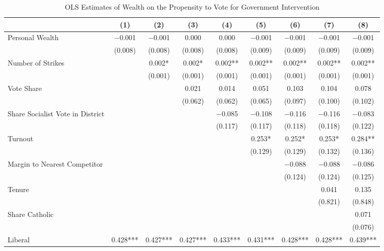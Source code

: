 \begin{table}

\caption{\label{tab:baseline_ols_govtint}OLS Estimates of Wealth on the Propensity to Vote for Government Intervention}
\centering
\begin{tabular}[t]{lcccccccc}
\toprule
  & (1) & (2) & (3) & (4) & (5) & (6) & (7) & (8)\\
\midrule
Personal Wealth & \num{-0.001} & \num{-0.001} & \num{0.000} & \num{0.000} & \num{-0.001} & \num{-0.001} & \num{-0.001} & \num{-0.001}\\
 & (\num{0.008}) & (\num{0.008}) & (\num{0.008}) & (\num{0.008}) & (\num{0.009}) & (\num{0.009}) & (\num{0.009}) & (\num{0.009})\\
Number of Strikes &  & \num{0.002}* & \num{0.002}* & \num{0.002}** & \num{0.002}** & \num{0.002}** & \num{0.002}** & \num{0.002}**\\
 &  & (\num{0.001}) & (\num{0.001}) & (\num{0.001}) & (\num{0.001}) & (\num{0.001}) & (\num{0.001}) & (\num{0.001})\\
Vote Share &  &  & \num{0.021} & \num{0.014} & \num{0.051} & \num{0.103} & \num{0.104} & \num{0.078}\\
 &  &  & (\num{0.062}) & (\num{0.062}) & (\num{0.065}) & (\num{0.097}) & (\num{0.100}) & (\num{0.102})\\
Share Socialist Vote in District &  &  &  & \num{-0.085} & \num{-0.108} & \num{-0.116} & \num{-0.116} & \num{-0.083}\\
 &  &  &  & (\num{0.117}) & (\num{0.117}) & (\num{0.118}) & (\num{0.118}) & (\num{0.122})\\
Turnout &  &  &  &  & \num{0.253}* & \num{0.252}* & \num{0.253}* & \num{0.284}**\\
 &  &  &  &  & (\num{0.129}) & (\num{0.129}) & (\num{0.132}) & (\num{0.136})\\
Margin to Nearest Competitor &  &  &  &  &  & \num{-0.088} & \num{-0.088} & \num{-0.086}\\
 &  &  &  &  &  & (\num{0.124}) & (\num{0.124}) & (\num{0.125})\\
Tenure &  &  &  &  &  &  & \num{0.041} & \num{0.135}\\
 &  &  &  &  &  &  & (\num{0.821}) & (\num{0.848})\\
Share Catholic &  &  &  &  &  &  &  & \num{0.071}\\
 &  &  &  &  &  &  &  & (\num{0.076})\\
Liberal & \num{0.428}*** & \num{0.427}*** & \num{0.427}*** & \num{0.433}*** & \num{0.431}*** & \num{0.428}*** & \num{0.428}*** & \num{0.439}***\\

\end{tabular}
\end{table}
